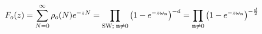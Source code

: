 \begin{equation}\label{fo}
F_o(z) = \sum_{N = 0}^\infty \rho_o(N) e^{- z N} 
= \prod_{{\rm SW}; \; {\bf n} \ne 0} 
\left( 1 - e^{- z \omega_{{\bf n}}} \right)^{- d}  
= \prod_{{\bf n} \ne 0} \left( 
1 - e^{- z \omega_{{\bf n}}} \right)^{- \frac{d}{2}} 
\end{equation} 
